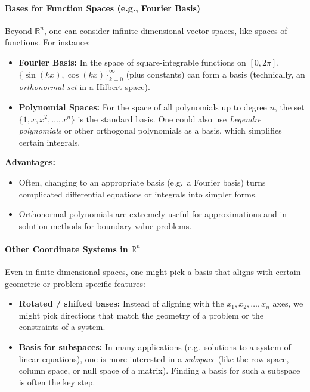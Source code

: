 \paragraph{Bases for Function Spaces (e.g., Fourier Basis)}

\noindent
Beyond $\mathbb{R}^n$, one can consider infinite-dimensional vector spaces, 
like spaces of functions. For instance:
\begin{itemize}
\item \textbf{Fourier Basis:} 
  In the space of square-integrable functions on $[0, 2\pi]$, 
  $\bigl\{\sin(kx), \cos(kx)\bigr\}_{k=0}^\infty$ (plus constants) 
  can form a basis (technically, an \emph{orthonormal set} in a Hilbert space).
\item \textbf{Polynomial Spaces:} 
  For the space of all polynomials up to degree $n$, the set 
  $\{1, x, x^2, \dots, x^n\}$ is the standard basis. One could also use 
  \emph{Legendre polynomials} or other orthogonal polynomials as a basis, 
  which simplifies certain integrals.
\end{itemize}

\noindent
\textbf{Advantages:}
\begin{itemize}
\item Often, changing to an appropriate basis (e.g.\ a Fourier basis) turns 
  complicated differential equations or integrals into simpler forms.
\item Orthonormal polynomials are extremely useful for approximations 
  and in solution methods for boundary value problems.
\end{itemize}

\paragraph{Other Coordinate Systems in $\mathbb{R}^n$}

\noindent
Even in finite-dimensional spaces, one might pick a basis that aligns with certain 
geometric or problem-specific features:
\begin{itemize}
\item \textbf{Rotated / shifted bases:} 
  Instead of aligning with the $x_1, x_2, \dots, x_n$ axes, we might pick directions 
  that match the geometry of a problem or the constraints of a system.
\item \textbf{Basis for subspaces:} 
  In many applications (e.g.\ solutions to a system of linear equations), 
  one is more interested in a \emph{subspace} (like the row space, column space, or null space 
  of a matrix). Finding a basis for such a subspace is often the key step.
\end{itemize}

